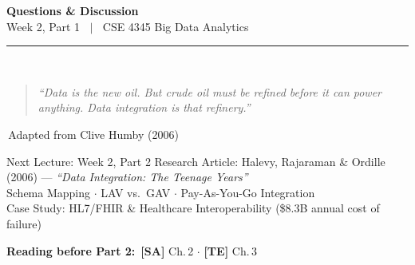\documentclass[aspectratio=169,10pt]{beamer}
\begin{document}
\begin{frame}[c]
  \begin{center}
    {\Large\bfseries Questions \& Discussion}\\[10pt]
    {\large Week 2, Part 1 $\;\mid\;$ CSE 4345 Big Data Analytics}\\[8pt]
    \textcolor{PUGray}{\rule{7cm}{0.5pt}}\\[10pt]
    \begin{quote}
      \itshape ``Data is the new oil.  But crude oil must be refined before it can power anything.
                 Data integration is that refinery.''
    \end{quote}
    \hfill\textemdash\,Adapted from Clive Humby (2006)
    \vspace{16pt}
    \begin{block}{\centering Next Lecture: Week 2, Part 2}
      \centering
      Research Article: Halevy, Rajaraman \& Ordille (2006) — \textit{``Data Integration: The Teenage Years''}\\[4pt]
      \small Schema Mapping $\cdot$ LAV vs.\ GAV $\cdot$ Pay-As-You-Go Integration\\
      Case Study: HL7/FHIR \& Healthcare Interoperability (\$8.3B annual cost of failure)
    \end{block}
    \vspace{6pt}
    \textbf{Reading before Part 2:}\ \textbf{[SA]} Ch.\,2 $\cdot$ \textbf{[TE]} Ch.\,3
  \end{center}
\end{frame}

\end{document}
